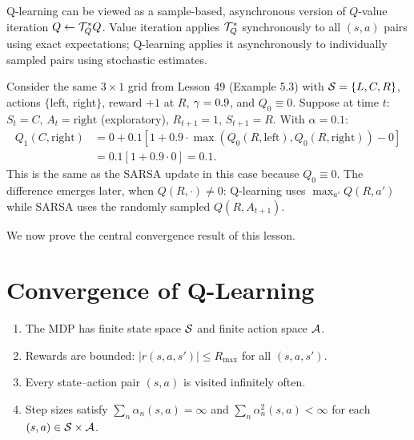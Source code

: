 \documentclass[11pt,a4paper]{article}
\begin{document}
\begin{remark}
\label{rem:value_iteration}
Q-learning can be viewed as a sample-based, asynchronous version of
$Q$-value iteration $Q \leftarrow \mathcal{T}^*_Q Q$. Value iteration
applies $\mathcal{T}^*_Q$ synchronously to all $(s,a)$ pairs using
exact expectations; Q-learning applies it asynchronously to
individually sampled pairs using stochastic estimates.
\end{remark}

\begin{example}
\label{ex:qlearning_update}
Consider the same $3 \times 1$ grid from Lesson 49 (Example 5.3)
with $\mathcal{S} = \{L, C, R\}$, actions $\{$left, right$\}$,
reward $+1$ at $R$, $\gamma = 0.9$, and $Q_0 \equiv 0$.
Suppose at time $t$: $S_t = C$, $A_t = \text{right}$ (exploratory),
$R_{t+1} = 1$, $S_{t+1} = R$. With $\alpha = 0.1$:
\begin{align*}
  Q_1(C, \text{right})
  &= 0 + 0.1[1 + 0.9 \cdot \max(Q_0(R, \text{left}),
     Q_0(R, \text{right})) - 0] \\
  &= 0.1[1 + 0.9 \cdot 0] = 0.1.
\end{align*}
This is the same as the SARSA update in this case because
$Q_0 \equiv 0$. The difference emerges later, when
$Q(R, \cdot) \neq 0$: Q-learning uses
$\max_{a'} Q(R, a')$ while SARSA uses the randomly sampled
$Q(R, A_{t+1})$.
\end{example}

We now prove the central convergence result of this lesson.

\section{Convergence of Q-Learning}
\label{sec:convergence}

\begin{assumption}
\label{ass:qlearning}
\begin{enumerate}[nosep]
  \item The MDP has finite state space $\mathcal{S}$ and finite action
    space $\mathcal{A}$.
  \item Rewards are bounded: $|r(s,a,s')| \leq R_{\max}$ for all
    $(s,a,s')$.
  \item Every state--action pair $(s,a)$ is visited infinitely often.
  \item Step sizes satisfy $\sum_n \alpha_n(s,a) = \infty$ and
    $\sum_n \alpha_n^2(s,a) < \infty$ for each
    $(s,a) \in \mathcal{S} \times \mathcal{A}$.
\end{enumerate}
\end{assumption}
\end{document}
